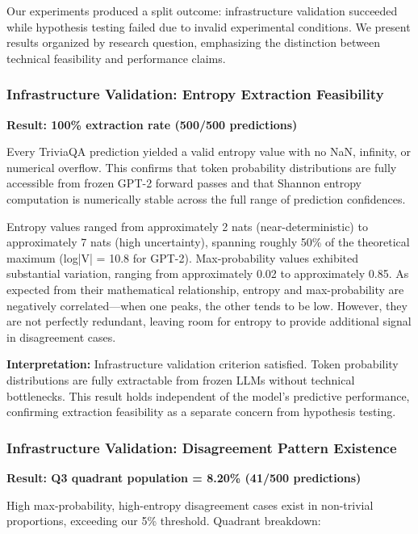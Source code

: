 
Our experiments produced a split outcome: infrastructure validation succeeded while hypothesis testing failed due to invalid experimental conditions. We present results organized by research question, emphasizing the distinction between technical feasibility and performance claims.

\subsubsection{Infrastructure Validation: Entropy Extraction Feasibility}

\textbf{Result: 100\% extraction rate (500/500 predictions)}

Every TriviaQA prediction yielded a valid entropy value with no NaN, infinity, or numerical overflow. This confirms that token probability distributions are fully accessible from frozen GPT-2 forward passes and that Shannon entropy computation is numerically stable across the full range of prediction confidences.

Entropy values ranged from approximately 2 nats (near-deterministic) to approximately 7 nats (high uncertainty), spanning roughly 50\% of the theoretical maximum (log|V| = 10.8 for GPT-2). Max-probability values exhibited substantial variation, ranging from approximately 0.02 to approximately 0.85. As expected from their mathematical relationship, entropy and max-probability are negatively correlated---when one peaks, the other tends to be low. However, they are not perfectly redundant, leaving room for entropy to provide additional signal in disagreement cases.

\textbf{Interpretation:} Infrastructure validation criterion satisfied. Token probability distributions are fully extractable from frozen LLMs without technical bottlenecks. This result holds independent of the model's predictive performance, confirming extraction feasibility as a separate concern from hypothesis testing.

\subsubsection{Infrastructure Validation: Disagreement Pattern Existence}

\textbf{Result: Q3 quadrant population = 8.20\% (41/500 predictions)}

High max-probability, high-entropy disagreement cases exist in non-trivial proportions, exceeding our 5\% threshold. Quadrant breakdown:


